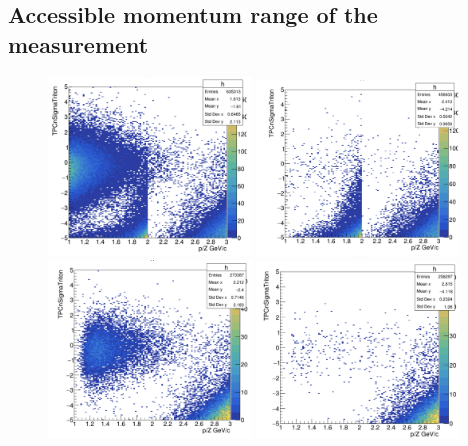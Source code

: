 \subsection{Accessible momentum range of the measurement}
\begin{figure}
    \centering
    \includegraphics[width=0.48\textwidth]{figures/triton/tbar_TPCnSigma_noTOF_noDCA.png}
    \includegraphics[width=0.48\textwidth]{figures/triton/tbar_TPCnSigma_noTOFcut.png}
    \includegraphics[width=0.48\textwidth]{figures/triton/tbar_TPCnSigma_TOF_cit_noDCA_cut.png}
    \includegraphics[width=0.48\textwidth]{figures/triton/tbar_TPCnSigma_TOF_cut_and_DCA_cut.png}

\end{figure}
